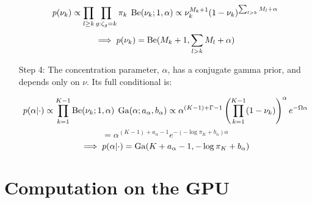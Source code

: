 \begin{enumerate}
  \begin{equation}
    p(\nu_k) \propto \prod_{l \ge k} \prod_{g:\zeta_g=k} \pi_k \; \operatorname{Be}(\nu_k; 1, \alpha) \propto \nu_k^{M_k + 1}(1-\nu_k)^{\sum_{l > k} M_l + \alpha} 
  \end{equation}
  \begin{equation*}
    \implies p(\nu_k)=\operatorname{Be}(M_k + 1, \sum_{l>k}M_l + \alpha)
  \end{equation*}
\item[Step 4:]
  The concentration parameter, $\alpha$, has a conjugate gamma prior, and depends only on $\nu$. Its full conditional is:

  \begin{equation}
    p(\alpha|\cdot) \propto \prod_{k=1}^{K-1} \operatorname{Be}(\nu_k;1, \alpha) \; \operatorname{Ga}(\alpha;a_\alpha,b_\alpha)
\propto \alpha^{(K-1) + \Gamma - 1} \left(\prod_{k=1}^{K-1} (1-\nu_k)\right)^\alpha e^{-\Omega \alpha} 
  \end{equation}
  \begin{equation*}
    = \alpha^{(K-1) + a_\alpha - 1} e^{-(-\log \pi_K + b_\alpha) \alpha}
  \end{equation*}
  \begin{equation*}
    \implies p(\alpha|\cdot) = \operatorname{Ga}(K + a_\alpha - 1, -\log \pi_K + b_\alpha)
  \end{equation*}
\end{enumerate}

\section{Computation on the GPU}
\label{sec:computation}
